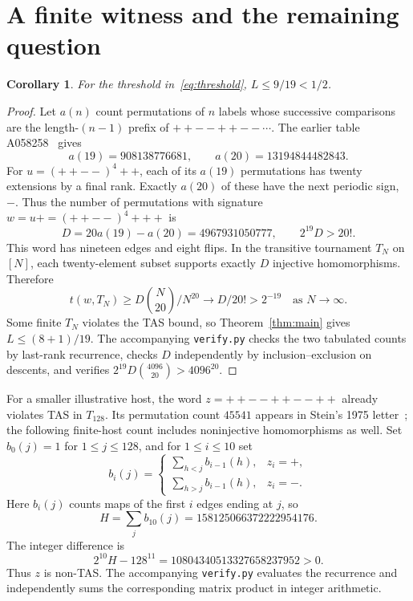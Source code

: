 \documentclass[11pt]{article}
\newtheorem{corollary}[theorem]{Corollary}
\begin{document}
\section{A finite witness and the remaining question}
\begin{corollary}\label{cor:half}
For the threshold in~\eqref{eq:threshold}, $L\leq9/19<1/2$.
\end{corollary}
\begin{proof}
Let $a(n)$ count permutations of $n$ labels whose successive comparisons
are the length-$(n-1)$ prefix of $++--++--\cdots$.
The earlier table A058258~\cite{OEIS} gives
\[
 a(19)=908138776681,\qquad a(20)=13194844482843.
\]
For $u=(++--)^4++$, each of its $a(19)$ permutations has twenty extensions
by a final rank. Exactly $a(20)$ of these have the next periodic sign, $-$.
Thus the number of permutations with signature $w=u+=(++--)^4+++$ is
\[
 D=20a(19)-a(20)=4967931050777,
 \qquad 2^{19}D>20!.
\]
This word has nineteen edges and eight flips. In the transitive tournament
$T_N$ on $[N]$, each twenty-element subset supports exactly $D$ injective
homomorphisms. Therefore
\[
 t(w,T_N)\geq D\binom{N}{20}/N^{20}\longrightarrow D/20!>2^{-19}
 \quad\text{as }N\to\infty.
\]
Some finite $T_N$ violates the TAS bound, so
Theorem~\ref{thm:main} gives $L\leq(8+1)/19$.
The accompanying \texttt{verify.py} checks the two tabulated counts by
last-rank recurrence, checks $D$ independently by inclusion--exclusion on
descents, and verifies $2^{19}D\binom{4096}{20}>4096^{20}$.
\end{proof}

For a smaller illustrative host, the word $z=++--++--++$ already violates
TAS in $T_{128}$. Its permutation count $45541$ appears in Stein's
1975 letter~\cite[p. 2]{Stein}; the following finite-host count includes
noninjective homomorphisms as well. Set $b_0(j)=1$ for $1\leq j\leq128$,
and for $1\leq i\leq10$ set
\[
 b_i(j)=\begin{cases}
 \sum_{h<j}b_{i-1}(h),&z_i=+,\\
 \sum_{h>j}b_{i-1}(h),&z_i=-.
 \end{cases}
\]
Here $b_i(j)$ counts maps of the first $i$ edges ending at $j$, so
\[
 H=\sum_jb_{10}(j)=158125066372222954176.
\]
The integer difference is
\[
 2^{10}H-128^{11}=10804340513327658237952>0.
\]
Thus $z$ is non-TAS. The accompanying \texttt{verify.py} evaluates the
recurrence and independently sums the corresponding matrix product in
integer arithmetic.
\end{document}
